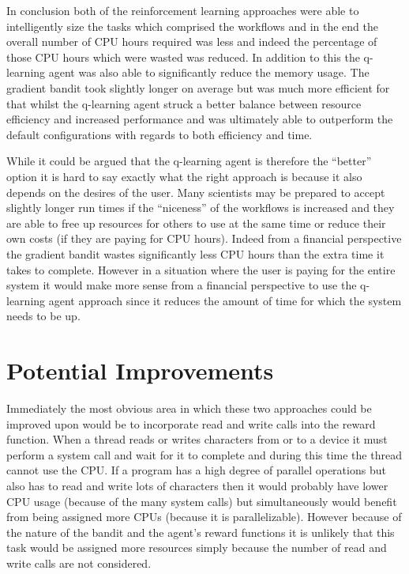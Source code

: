 In conclusion both of the reinforcement learning approaches were able to intelligently size the tasks which comprised the workflows and in the end the overall number of CPU hours required was less and indeed the percentage of those CPU hours which were wasted was reduced. In addition to this the q-learning agent was also able to significantly reduce the memory usage. The gradient bandit took slightly longer on average but was much more efficient for that whilst the q-learning agent struck a better balance between resource efficiency and increased performance and was ultimately able to outperform the default configurations with regards to both efficiency and time.

While it could be argued that the q-learning agent is therefore the “better” option it is hard to say exactly what the right approach is because it also depends on the desires of the user. Many scientists may be prepared to accept slightly longer run times if the “niceness” of the workflows is increased and they are able to free up resources for others to use at the same time or reduce their own costs (if they are paying for CPU hours). Indeed from a financial perspective the gradient bandit wastes significantly less CPU hours than the extra time it takes to complete. However in a situation where the user is paying for the entire system it would make more sense from a financial perspective to use the q-learning agent approach since it reduces the amount of time for which the system needs to be up.

\section{Potential Improvements}
\label{sec:pot_improvement}

Immediately the most obvious area in which these two approaches could be improved upon would be to incorporate read and write calls into the reward function. When a thread reads or writes characters from or to a device it must perform a system call and wait for it to complete and during this time the thread cannot use the CPU. If a program has a high degree of parallel operations but also has to read and write lots of characters then it would probably have lower CPU usage (because of the many system calls) but simultaneously would benefit from being assigned more CPUs (because it is parallelizable). However because of the nature of the bandit and the agent’s reward functions it is unlikely that this task would be assigned more resources simply because the number of read and write calls are not considered.

